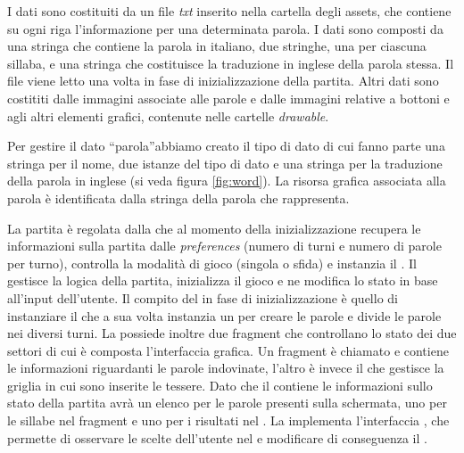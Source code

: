 
I dati sono costituiti da un file \emph{txt} inserito nella cartella degli assets, che contiene su ogni riga l'informazione per una determinata parola. I dati sono composti da una stringa che contiene la parola in italiano, due stringhe, una per ciascuna sillaba, e una stringa che costituisce la traduzione in inglese della parola stessa. Il file viene letto una volta in fase di inizializzazione della partita. Altri dati sono costititi dalle immagini associate alle parole e dalle immagini relative a bottoni e agli altri elementi grafici, contenute nelle cartelle \emph{drawable}.

Per gestire il dato ``parola''abbiamo creato il tipo di dato  di cui fanno parte una stringa per il nome, due istanze del tipo di dato  e una stringa per la traduzione della parola in inglese (si veda figura \ref{fig:word}). La risorsa grafica associata alla parola è identificata dalla stringa della parola che rappresenta.


La partita è regolata dalla  che al momento della inizializzazione recupera le informazioni sulla partita dalle \emph{preferences} (numero di turni e numero di parole per turno), controlla la modalità di gioco (singola o sfida) e instanzia il . Il  gestisce la logica della partita, inizializza il gioco e ne modifica lo stato in base all'input dell'utente. Il compito del  in fase di inizializzazione è quello di instanziare il  che a sua volta instanzia un  per creare le parole e divide le parole nei diversi turni. La  possiede inoltre due fragment che controllano lo stato dei due settori di cui è composta l'interfaccia grafica. Un fragment è chiamato  e contiene le informazioni riguardanti le parole indovinate, l'altro è invece il  che gestisce la griglia in cui sono inserite le tessere. Dato che il  contiene le informazioni sullo stato della partita avrà un elenco per le parole presenti sulla schermata, uno per le sillabe nel fragment  e uno per i risultati nel . La  implementa l'interfaccia , che permette di osservare le scelte dell'utente nel  e modificare di conseguenza il .

